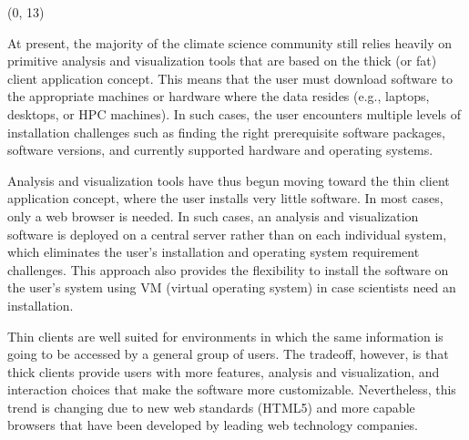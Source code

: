 \documentclass[a0,landscape]{a0poster}
\newcommand{\dospace}{\vspace*{0.9cm}}
\newenvironment{pcol}[1]{
  \begin{minipage}[t]{#1}
}{
  \end{minipage}
}
\begin{document}
\dospace


\begin{textblock}{35}(0, 13)
\begin{pcol}{\threecolwidth}


\large
At present, the majority of the climate science community still relies heavily on primitive analysis and visualization tools that are based on the thick (or fat) client application concept. This means that the user must download software to the appropriate machines or hardware where the data resides (e.g., laptops, desktops, or HPC machines). In such cases, the user encounters multiple levels of installation challenges such as finding the right prerequisite software packages, software versions, and currently supported hardware and operating systems.

Analysis and visualization tools have thus begun moving toward the thin client application concept, where the user installs very little software. In most cases, only a web browser is needed. In such cases, an analysis and visualization software is deployed on a central server rather than on each individual system, which eliminates the user’s installation and operating system requirement challenges. This approach also provides the flexibility to install the software on the user’s system using VM (virtual operating system) in case scientists need an installation.

Thin clients are well suited for environments in which the same information is going to be accessed by a general group of users. The tradeoff, however, is that thick clients provide users with more features, analysis and visualization, and interaction choices that make the software more customizable. Nevertheless, this trend is changing due to new web standards (HTML5) and more capable browsers that have been developed by leading web technology companies.


\end{pcol}
\end{textblock}
\end{document}

